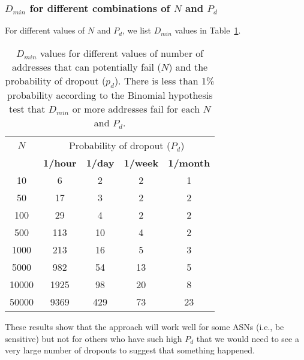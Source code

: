 
\subsubsection*{$D_{min}$ for different combinations of $N$ and $P_d$}

For different values of $N$ and $P_d$, we list $D_{min}$ values in
Table~\ref{tbl:binomial_thresh}. 

\begin{table}[th]
  \centering
  \hspace{-0.04in}
  \begin{tabular}{c|c|c|c|c|}
$N$ & \multicolumn{4}{c|}{Probability of dropout ($P_d$)} \\
    & \textbf{1/hour} & \textbf{1/day} & \textbf{1/week} &
    \textbf{1/month} \\
    \hline
10 & 6 & 2 & 2 & 1\\
50 & 17 & 3 & 2 & 2\\
100 & 29 & 4 & 2 & 2\\
500 & 113 & 10 & 4 & 2\\
1000 & 213 & 16 & 5 & 3\\
5000 & 982 & 54 & 13 & 5\\
10000 & 1925 & 98 & 20 & 8\\
50000 & 9369 & 429 & 73 & 23\\
    \end{tabular}
  \caption{\label{tbl:binomial_thresh} $D_{min}$ values
    for different
    values of number of addresses that can potentially fail ($N$) and
    the probability of dropout ($p_d$). There is less than 1\%
    probability according to the Binomial hypothesis test that
    $D_{min}$ or more addresses fail for each $N$ and $P_d$.
  }
\end{table}

These results show that the approach will work well for some ASNs (i.e., be
sensitive) but not for others who have such high $P_d$ that we would need to see a very large number of dropouts to suggest that something happened.





